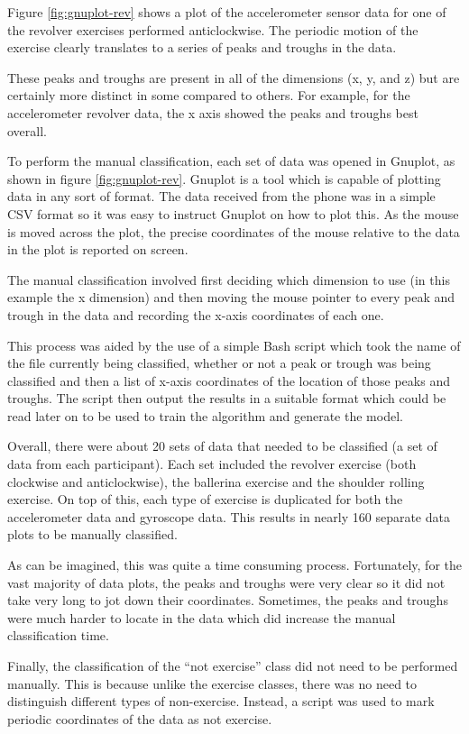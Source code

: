 Figure \ref{fig:gnuplot-rev} shows a plot of the accelerometer sensor data for one of the revolver exercises performed anticlockwise. The periodic motion of the exercise clearly translates to a series of peaks and troughs in the data.

These peaks and troughs are present in all of the dimensions (x, y, and z) but are certainly more distinct in some compared to others.  For example, for the accelerometer revolver data, the x axis showed the peaks and troughs best overall.

To perform the manual classification, each set of data was opened in Gnuplot, as shown in figure \ref{fig:gnuplot-rev}. Gnuplot is a tool which is capable of plotting data in any sort of format. The data received from the phone was in a simple CSV format so it was easy to instruct Gnuplot on how to plot this. As the mouse is moved across the plot, the precise coordinates of the mouse relative to the data in the plot is reported on screen. 

The manual classification involved first deciding which dimension to use (in this example the x dimension) and then moving the mouse pointer to every peak and trough in the data and recording the x-axis coordinates of each one.

This process was aided by the use of a simple Bash script which took the name of the file currently being classified, whether or not a peak or trough was being classified and then a list of x-axis coordinates of the location of those peaks and troughs. The script then output the results in a suitable format which could be read later on to be used to train the algorithm and generate the model.

Overall, there were about 20 sets of data that needed to be classified (a set of data from each participant). Each set included the revolver exercise (both clockwise and anticlockwise), the ballerina exercise and the shoulder rolling exercise. On top of this, each type of exercise is duplicated for both the accelerometer data and gyroscope data. This results in nearly 160 separate data plots to be manually classified.

As can be imagined, this was quite a time consuming process. Fortunately, for the vast majority of data plots, the peaks and troughs were very clear so it did not take very long to jot down their coordinates. Sometimes, the peaks and troughs were much harder to locate in the data which did increase the manual classification time.

Finally, the classification of the “not exercise” class did not need to be performed manually. This is because unlike the exercise classes, there was no need to distinguish different types of non-exercise. Instead, a script was used to mark periodic coordinates of the data as not exercise.
